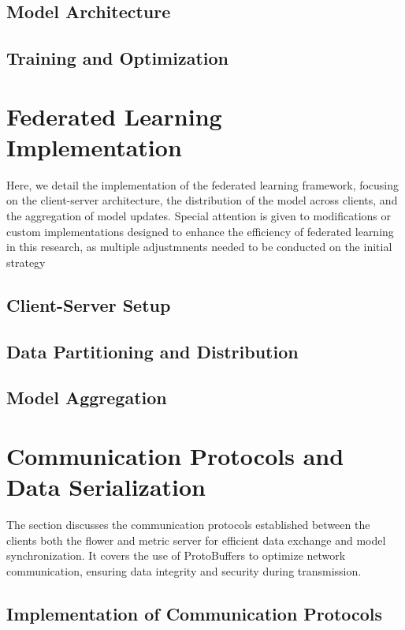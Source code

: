\subsection{Model Architecture}
\subsection{Training and Optimization}

\section{Federated Learning Implementation}
Here, we detail the implementation of the federated learning framework, focusing on the client-server architecture,
the distribution of the model across clients, and the aggregation of model updates. Special attention is given to
modifications or custom implementations designed to enhance the efficiency of federated learning in this research,
as multiple adjustmnents needed to be conducted on the initial strategy

\subsection{Client-Server Setup}
\subsection{Data Partitioning and Distribution}
\subsection{Model Aggregation}

\section{Communication Protocols and Data Serialization}
The section discusses the communication protocols established between the clients both the flower and metric server
for efficient data exchange and model synchronization. It covers the use of ProtoBuffers
to optimize network communication, ensuring data integrity and security during transmission.

\subsection{Implementation of Communication Protocols}
